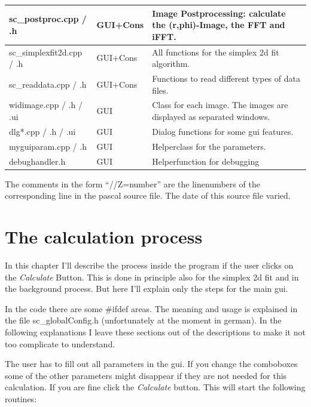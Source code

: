 \documentclass[11pt]{article} %
\begin{document}
\begin{longtable}{|L{4.5cm}|C{1.8cm}|L{10.9cm}|}
sc\_postproc.cpp / .h & {\small GUI+Cons} & Image Postprocessing: calculate the (r,phi)-Image, the FFT and iFFT. \\ \hline
sc\_simplexfit2d.cpp / .h & {\small GUI+Cons} & All functions for the simplex 2d fit algorithm. \\ \hline
sc\_readdata.cpp / .h & {\small GUI+Cons} & Functions to read different types of data files. \\ \hline
widimage.cpp / .h / .ui & {\small GUI} & Class for each image. The images are displayed as separated windows. \\ \hline
dlg*.cpp / .h / .ui & {\small GUI} & Dialog functions for some gui features. \\ \hline
myguiparam.cpp / .h & {\small GUI} & Helperclass for the parameters. \\ \hline
debughandler.h & {\small GUI} & Helperfunction for debugging \\ \hline
\end{longtable}

The comments in the form ``//Z=number'' are the linenumbers of the corresponding line in the pascal source file. The date of this source file varied.



\clearpage
\section{The calculation process}

In this chapter I'll describe the process inside the program if the user clicks on the {\it Calculate} Button. This is done in principle also for the simplex 2d fit and in the background process. But here I'll explain only the steps for the main gui.

In the code there are some \#ifdef areas. The meaning and usage is explained in the file sc\_globalConfig.h (unfortunately at the moment in german). In the following explanations I leave these sections out of the descriptions to make it not too complicate to understand.

The user has to fill out all parameters in the gui. If you change the comboboxes some of the other parameters might disappear if they are not needed for this calculation. If you are fine click the {\it Calculate} button. This will start the following routines:
\end{document}
